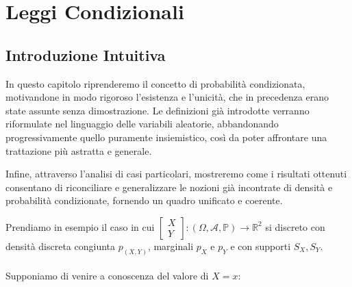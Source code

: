 \chapter{Leggi Condizionali}
\section{Introduzione Intuitiva}
In questo capitolo riprenderemo il concetto di probabilità condizionata, motivandone in modo rigoroso l’esistenza e l’unicità, che in precedenza erano state assunte senza dimostrazione. Le definizioni già introdotte verranno riformulate nel linguaggio delle variabili aleatorie, abbandonando progressivamente quello puramente insiemistico, così da poter affrontare una trattazione più astratta e generale.

\medskip
Infine, attraverso l’analisi di casi particolari, mostreremo come i risultati ottenuti consentano di riconciliare e generalizzare le nozioni già incontrate di densità e probabilità condizionate, fornendo un quadro unificato e coerente.

\bigskip
\noindent Prendiamo in esempio il caso in cui $\begin{bmatrix}X\\Y\end{bmatrix}:(\Omega,\mathcal{A}, \mathbb{P})\to \mathbb{R}^2$ si discreto con densità discreta congiunta $p_{(X, Y)}$, marginali $p_X$ e $p_Y$ e con supporti $S_X, S_Y$. \\
\\
Supponiamo di venire a conoscenza del valore di $X=x$:

